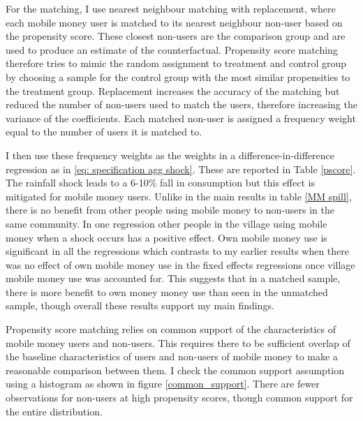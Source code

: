 For the matching, I use nearest neighbour matching with replacement, where each mobile money user is matched to its nearest neighbour non-user based on the propensity score. These closest non-users are the comparison group and are used to produce an estimate of the counterfactual. Propensity score matching therefore tries to mimic the random assignment to treatment and control group by choosing a sample for the control group with the most similar propensities to the treatment group. Replacement increases the accuracy of the matching but reduced the number of non-users used to match the users, therefore increasing the variance of the coefficients. Each matched non-user is assigned a frequency weight equal to the number of users it is matched to.

I then use these frequency weights as the weights in a difference-in-difference regression as in \eqref{eq: specification agg shock}. These are reported in Table \ref{pscore}. The rainfall shock leads to a 6-10\% fall in consumption but this effect is mitigated for mobile money users. Unlike in the main results in table \ref{MM spill}, there is no benefit from other people using mobile money to non-users in the same community. In one regression other people in the village  using mobile money when a shock occurs has a positive effect. Own mobile money use is significant in all the regressions which contrasts to my earlier results when there was no effect of own mobile money use in the fixed effects regressions once village mobile money use was accounted for. This suggests that in a matched sample, there is more benefit to own money money use than seen in the unmatched sample, though overall these results support my main findings. 

  

 Propensity score matching relies on common support of the characteristics of mobile money users and non-users. This requires there to be sufficient overlap of the baseline characteristics of users and non-users of mobile money to make a reasonable comparison between them. I check the common support assumption using a histogram as shown in figure \ref{common_support}. There are fewer observations for non-users at high propensity scores, though common support for the entire distribution.  

